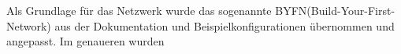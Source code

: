 Als Grundlage für das Netzwerk wurde das sogenannte BYFN(Build-Your-First-Network) aus der Dokumentation und Beispielkonfigurationen übernommen und angepasst.
Im genaueren wurden 